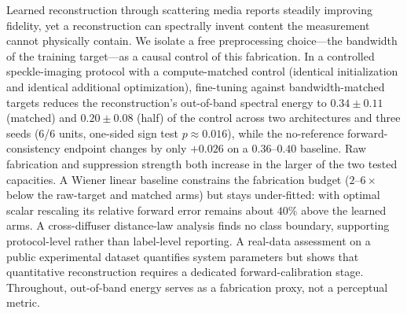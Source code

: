 Learned reconstruction through scattering media reports steadily improving fidelity, yet a reconstruction can spectrally invent content the measurement cannot physically contain. We isolate a free preprocessing choice---the bandwidth of the training target---as a causal control of this fabrication. In a controlled speckle-imaging protocol with a compute-matched control (identical initialization and identical additional optimization), fine-tuning against bandwidth-matched targets reduces the reconstruction's out-of-band spectral energy to $0.34\pm0.11$ (matched) and $0.20\pm0.08$ (half) of the control across two architectures and three seeds (6/6 units, one-sided sign test $p\approx0.016$), while the no-reference forward-consistency endpoint changes by only $+0.026$ on a $0.36$--$0.40$ baseline. Raw fabrication and suppression strength both increase in the larger of the two tested capacities. A Wiener linear baseline constrains the fabrication budget ($2$--$6\times$ below the raw-target and matched arms) but stays under-fitted: with optimal scalar rescaling its relative forward error remains about $40\%$ above the learned arms. A cross-diffuser distance-law analysis finds no class boundary, supporting protocol-level rather than label-level reporting. A real-data assessment on a public experimental dataset quantifies system parameters but shows that quantitative reconstruction requires a dedicated forward-calibration stage. Throughout, out-of-band energy serves as a fabrication proxy, not a perceptual metric.

